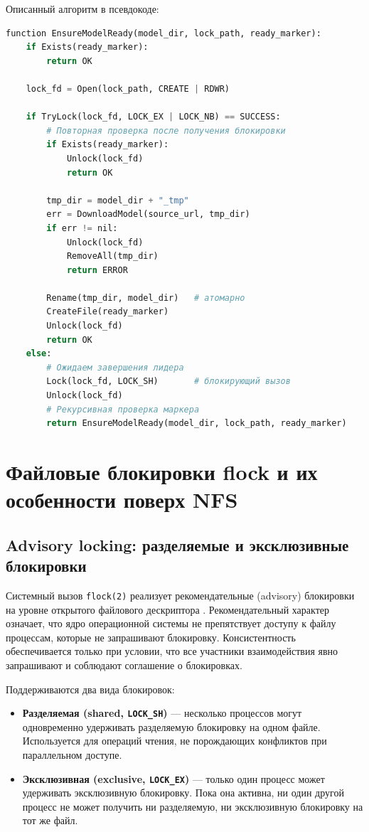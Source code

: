 Описанный алгоритм в псевдокоде:

\begin{lstlisting}[language=Python, caption={Псевдокод координированной загрузки модели}]
function EnsureModelReady(model_dir, lock_path, ready_marker):
    if Exists(ready_marker):
        return OK

    lock_fd = Open(lock_path, CREATE | RDWR)

    if TryLock(lock_fd, LOCK_EX | LOCK_NB) == SUCCESS:
        # Повторная проверка после получения блокировки
        if Exists(ready_marker):
            Unlock(lock_fd)
            return OK

        tmp_dir = model_dir + "_tmp"
        err = DownloadModel(source_url, tmp_dir)
        if err != nil:
            Unlock(lock_fd)
            RemoveAll(tmp_dir)
            return ERROR

        Rename(tmp_dir, model_dir)   # атомарно
        CreateFile(ready_marker)
        Unlock(lock_fd)
        return OK
    else:
        # Ожидаем завершения лидера
        Lock(lock_fd, LOCK_SH)       # блокирующий вызов
        Unlock(lock_fd)
        # Рекурсивная проверка маркера
        return EnsureModelReady(model_dir, lock_path, ready_marker)
\end{lstlisting}

\section{Файловые блокировки flock и их особенности поверх NFS}

\subsection*{Advisory locking: разделяемые и эксклюзивные блокировки}

Системный вызов \texttt{flock(2)} реализует рекомендательные (advisory) блокировки на уровне открытого файлового дескриптора \cite{flock_man}. Рекомендательный характер означает, что ядро операционной системы не препятствует доступу к файлу процессам, которые не запрашивают блокировку. Консистентность обеспечивается только при условии, что все участники взаимодействия явно запрашивают и соблюдают соглашение о блокировках.

Поддерживаются два вида блокировок:
\begin{itemize}[leftmargin=*]
  \item \textbf{Разделяемая (shared, \texttt{LOCK\_SH})} --- несколько процессов могут одновременно удерживать разделяемую блокировку на одном файле. Используется для операций чтения, не порождающих конфликтов при параллельном доступе.
  \item \textbf{Эксклюзивная (exclusive, \texttt{LOCK\_EX})} --- только один процесс может удерживать эксклюзивную блокировку. Пока она активна, ни один другой процесс не может получить ни разделяемую, ни эксклюзивную блокировку на тот же файл.
\end{itemize}

